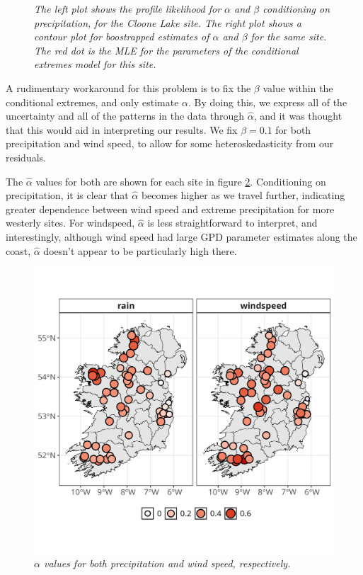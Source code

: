 \documentclass{article}
\numberwithin{equation}{section}
\begin{document}
\begin{figure}[H]
\begin{minipage}{0.44\textwidth}
    \end{minipage}
    \caption{\emph{The left plot shows the profile likelihood for $\alpha$ and $\beta$ conditioning on precipitation, for the Cloone Lake site. The right plot shows a contour plot for boostrapped estimates of $\alpha$ and $\beta$ for the same site. The red dot is the MLE for the parameters of the conditional extremes model for this site.}}
    \label{fig:04_uncertainty}
\end{figure}

A rudimentary workaround for this problem is to fix the $\beta$ value within the conditional extremes, and only estimate $\alpha$.
By doing this, we express all of the uncertainty and all of the patterns in the data through $\hat{\alpha}$, and it was thought that this would aid in interpreting our results.
We fix $\beta = 0.1$ for both precipitation and wind speed, to allow for some heteroskedasticity from our residuals.

The $\hat{\alpha}$ values for both are shown for each site in figure \ref{fig:04_alpha_map}.
Conditioning on precipitation, it is clear that $\hat{\alpha}$ becomes higher as we travel further, indicating greater dependence between wind speed and extreme precipitation for more westerly sites. 
For windspeed, $\hat{\alpha}$ is less straightforward to interpret, and interestingly, although wind speed had large GPD parameter estimates along the coast, $\hat{\alpha}$ doesn't appear to be particularly high there. 

\begin{figure}[H]
    \centering
    \includegraphics[width = 0.7\linewidth]{plots/045_alpha_map.png}
    \caption{\emph{$\alpha$ values for both precipitation and wind speed, respectively.}}
    \label{fig:04_alpha_map}
\end{figure}
\end{document}
